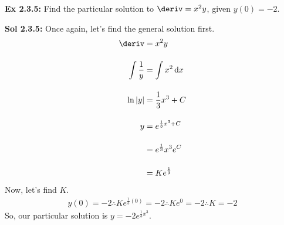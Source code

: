 \begin{tcolorbox}[example]
    \textbf{Ex 2.3.5: } Find the particular solution to $\deriv = x^2y$, given $y(0) = -2$.
\end{tcolorbox}
\begin{tcolorbox}[solution]
    \textbf{Sol 2.3.5: } Once again, let's find the general solution first. \begin{align*}
        \deriv &= x^2y \\[11pt]
        \int \dfrac{1}{y} &= \int x^2 \,\mathrm{d}x \\[11pt]
        \ln |y| &= \dfrac{1}{3}x^3 + C \\[11pt]
        y &\begin{aligned}[t]
            & = e^{\frac{1}{3}x^3 + C} \\[11pt]
            & = e^{\frac{1}{3}}x^3e^C \\[11pt]
            & = Ke^{\frac{1}{3}}
        \end{aligned}
    \end{align*}
    Now, let's find $K$. \begin{align*}
        y(0) = -2 \therefore Ke^{\frac{1}{3}(0)} = -2 \therefore Ke^0 = -2 \therefore K = -2
    \end{align*}
    So, our particular solution is $\boxed{y = -2e^{\frac{1}{3}x^3}}$.
\end{tcolorbox} \vspace{11pt}

